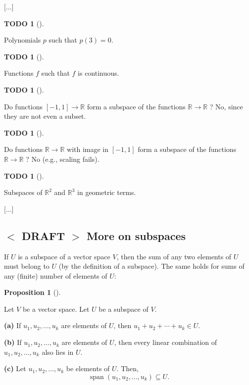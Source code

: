 \documentclass[numbers=enddot,12pt,final,onecolumn,notitlepage]{scrartcl}%
\theoremstyle{definition}
\newtheorem{prop}[theo]{Proposition}
\newenvironment{proposition}[1][]
{\begin{prop}[#1]\begin{leftbar}}
{\end{leftbar}\end{prop}}
\newtheorem{quest}[theo]{TODO}
\newenvironment{todo}[1][]
{\begin{quest}[#1]\begin{leftbar}}
{\end{leftbar}\end{quest}}
\begin{document}
[...]

\begin{todo}
Polynomials $p$ such that $p\left(  3\right)  =0$.
\end{todo}

\begin{todo}
Functions $f$ such that $f$ is continuous.
\end{todo}

\begin{todo}
Do functions $\left[  -1,1\right]  \rightarrow\mathbb{R}$ form a subspace of
the functions $\mathbb{R}\rightarrow\mathbb{R}$ ? No, since they are not even
a subset.
\end{todo}

\begin{todo}
Do functions $\mathbb{R}\rightarrow\mathbb{R}$ with image in $\left[
-1,1\right]  $ form a subspace of the functions $\mathbb{R}\rightarrow
\mathbb{R}$ ? No (e.g., scaling fails).
\end{todo}

\begin{todo}
Subspaces of $\mathbb{R}^{2}$ and $\mathbb{R}^{3}$ in geometric terms.
\end{todo}

[...]

\subsection{\label{sect.spaces.more-on-subs}%
$<$%
DRAFT%
$>$
More on subspaces}

If $U$ is a subspace of a vector space $V$, then the sum of any two elements
of $U$ must belong to $U$ (by the definition of a subspace). The same holds
for sums of any (finite) number of elements of $U$:

\begin{proposition}
\label{prop.subspace.closed}Let $V$ be a vector space. Let $U$ be a subspace
of $V$.

\textbf{(a)} If $u_{1},u_{2},\ldots,u_{k}$ are elements of $U$, then
$u_{1}+u_{2}+\cdots+u_{k}\in U$.

\textbf{(b)} If $u_{1},u_{2},\ldots,u_{k}$ are elements of $U$, then every
linear combination of $u_{1},u_{2},\ldots,u_{k}$ also lies in $U$.

\textbf{(c)} Let $u_{1},u_{2},\ldots,u_{k}$ be elements of $U$. Then,
\[
\operatorname{span}\left(  u_{1},u_{2},\ldots,u_{k}\right)  \subseteq U.
\]

\end{proposition}
\end{document}

